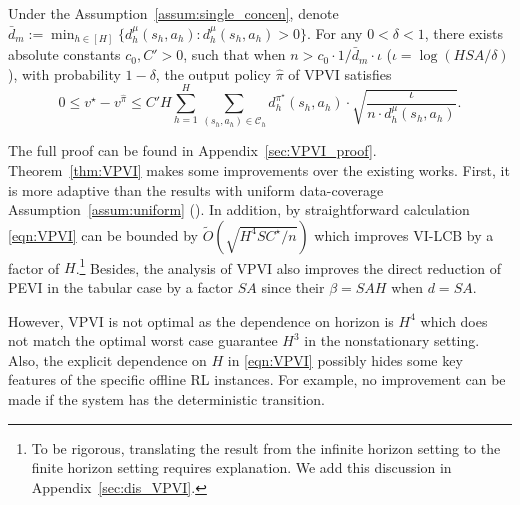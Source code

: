 \begin{theorem}\label{thm:VPVI}
Under the Assumption~\ref{assum:single_concen}, denote $\bar{d}_m:=\min_{h\in[H]}\{d^\mu_h(s_h,a_h):d^\mu_h(s_h,a_h)>0\}$. For any $0<\delta<1$, there exists absolute constants $c_0,C'>0$, such that when $n>c_0 \cdot 1/\bar{d}_m\cdot\iota$ ($\iota=\log(HSA/\delta)$), with probability $1-\delta$, the output policy $\widehat{\pi}$ of VPVI satisfies
{
\begin{equation}\label{eqn:VPVI}
0\leq v^\star-v^{\widehat{\pi}}\leq C'H\sum_{h=1}^H\sum_{(s_h,a_h)\in\mathcal{C}_h}d^{\pi^\star}_h(s_h,a_h)\cdot\sqrt{\frac{\iota}{ n\cdot d^\mu_h{(s_h,a_h)}}}.
\end{equation}
}
\end{theorem}
The full proof can be found in Appendix~\ref{sec:VPVI_proof}. Theorem~\ref{thm:VPVI} makes some improvements over the existing works. First, it is more adaptive than the results with uniform data-coverage Assumption~\ref{assum:uniform} (\cite{yin2021near,ren2021nearly}). In addition, by straightforward calculation \eqref{eqn:VPVI} can be bounded by $\tilde{O}(\sqrt{H^4SC^\star/n})$ which improves VI-LCB \citep{rashidinejad2021bridging} by a factor of $H$.\footnote{To be rigorous, translating the result from the infinite horizon setting to the finite horizon setting requires explanation. We add this discussion in Appendix~\ref{sec:dis_VPVI}.} Besides, the analysis of VPVI also improves the direct reduction of PEVI \citep{jin2020pessimism} in the tabular case by a factor $SA$ since their $\beta=SAH$ when $d=SA$.  

However, VPVI is not optimal as the dependence on horizon is $H^4$ which does not match the optimal worst case guarantee $H^3$ \citep{yin2021near} in the nonstationary setting. Also, the explicit dependence on $H$ in \eqref{eqn:VPVI} possibly hides some key features of the specific offline RL instances. For example, no improvement can be made if the system has the deterministic transition.
	
	
 








